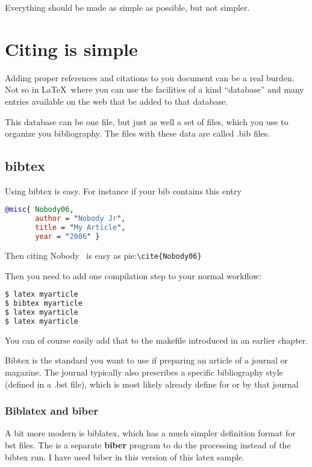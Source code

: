 \renewcommand\TheFile{ch08_citingsimple.tex}

\begin{savequote}[15cm]
  \raggedleft
\sffamily
Everything should be made as simple as possible, but not simpler.
\end{savequote}
\chapter{Citing is simple}

Adding proper references and citations to you document can be a real
burden.
Not so in \LaTeX\ where you can use the facilities of a kind ``database''
and many entries available on the web that be added to that database.

This database can be one file, but just as well a set of files, which
you use to organize you bibliography. The files with these data are
called .bib files. 

\section{bibtex}
Using bibtex is easy.
For instance if your bib contains this entry \cite{bibtexsite}
\begin{lstlisting}[language=BibTeX]
@misc{ Nobody06,
       author = "Nobody Jr",
       title = "My Article",
       year = "2006" }
\end{lstlisting}
\lstset{language=BibTeX}
Then citing Nobody~\cite{Nobody06} is easy as
pie:\lstinline|\cite{Nobody06}|

Then you need to add one compilation step to your normal workflow:

\begin{lstlisting}[language=sh]
$ latex myarticle
$ bibtex myarticle
$ latex myarticle
$ latex myarticle
\end{lstlisting}

You can of course easily add that to the makefile introduced in an
earlier chapter.

Bibtex is the standard you want to use if preparing an article of a
journal or magazine. The journal typically also prescribes a specific
bibliography style (defined in a .bst file), which is most likely
already define for or by that journal

\subsection{Biblatex and biber}
A bit more modern is biblatex, which has a much simpler definition
format for bst files. The is a separate \textbf{biber} program to do
the processing instead of the bibtex run.
I have used biber in this version of this latex sample.
